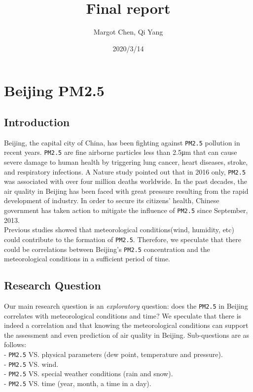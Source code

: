 \documentclass[]{article}
\title{Final report}
\author{Margot Chen, Qi Yang}
\date{2020/3/14}
\begin{document}
\maketitle

\hypertarget{beijing-pm2.5}{%
\section{Beijing PM2.5}\label{beijing-pm2.5}}

\hypertarget{introduction}{%
\subsection{Introduction}\label{introduction}}

Beijing, the capital city of China, has been fighting against
\texttt{PM2.5} pollution in recent years. \texttt{PM2.5} are fine
airborne particles less than 2.5μm that can cause severe damage to human
health by triggering lung cancer, heart diseases, stroke, and
respiratory infections. A Nature study pointed out that in 2016 only,
\texttt{PM2.5} was associated with over four million deaths worldwide.
In the past decades, the air quality in Beijing has been faced with
great pressure resulting from the rapid development of industry. In
order to secure its citizens' health, Chinese government has taken
action to mitigate the influence of \texttt{PM2.5} since September,
2013.\\
Previous studies showed that meteorological conditions(wind, humidity,
etc) could contribute to the formation of \texttt{PM2.5}. Therefore, we
speculate that there could be correlations between Beijing's
\texttt{PM2.5} concentration and the meteorological conditions in a
sufficient period of time.

\hypertarget{research-question}{%
\subsection{Research Question}\label{research-question}}

Our main research question is an \emph{exploratory} question: does the
\texttt{PM2.5} in Beijing correlates with meteorological conditions and
time? We speculate that there is indeed a correlation and that knowing
the meteorological conditions can support the assessment and even
prediction of air quality in Beijing. Sub-questions are as follows:\\
- \texttt{PM2.5} VS. physical parameters (dew point, temperature and
pressure).\\
- \texttt{PM2.5} VS. wind.\\
- \texttt{PM2.5} VS. special weather conditions (rain and snow).\\
- \texttt{PM2.5} VS. time (year, month, a time in a day).
\end{document}
